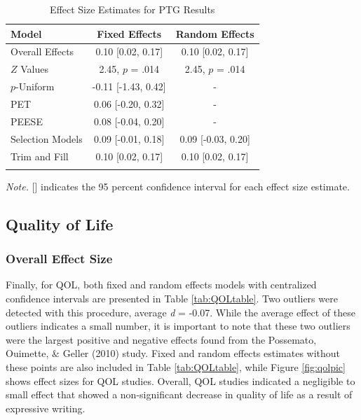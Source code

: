 \documentclass[man, mask]{apa6}
\theoremstyle{definition}
\theoremstyle{definition}
\theoremstyle{definition}
\theoremstyle{remark}
\begin{document}
\begin{table}[tbp]
\begin{center}
\begin{threeparttable}
\caption{\label{tab:PTGtable}Effect Size Estimates for PTG Results}
\small{
\begin{tabular}{lcc}
\toprule
Model & Fixed Effects & Random Effects\\
\midrule
Overall Effects & 0.10 [0.02, 0.17] & 0.10 [0.02, 0.17]\\
$Z$ Values & 2.45, $p$ = .014 & 2.45, $p$ = .014\\
$p$-Uniform & -0.11 [-1.43, 0.42] & -\\
PET & 0.06 [-0.20, 0.32] & -\\
PEESE & 0.08 [-0.04, 0.20] & -\\
Selection Models & 0.09 [-0.01, 0.18] & 0.09 [-0.03, 0.20]\\
Trim and Fill & 0.10 [0.02, 0.17] & 0.10 [0.02, 0.17]\\
\bottomrule
\addlinespace
\end{tabular}
}
\begin{tablenotes}[para]
\textit{Note.} [] indicates the 95 percent confidence interval for each effect size estimate.
\end{tablenotes}
\end{threeparttable}
\end{center}
\end{table}

\subsection{Quality of Life}\label{quality-of-life-1}

\subsubsection{Overall Effect Size}\label{overall-effect-size-2}

Finally, for QOL, both fixed and random effects models with centralized
confidence intervals are presented in Table \ref{tab:QOLtable}. Two
outliers were detected with this procedure, average \emph{d} = -0.07.
While the average effect of these outliers indicates a small number, it
is important to note that these two outliers were the largest positive
and negative effects found from the Possemato, Ouimette, \& Geller
(2010) study. Fixed and random effects estimates without these points
are also included in Table \ref{tab:QOLtable}, while Figure
\ref{fig:qolpic} shows effect sizes for QOL studies. Overall, QOL
studies indicated a negligible to small effect that showed a
non-significant decrease in quality of life as a result of expressive
writing.
\end{document}
